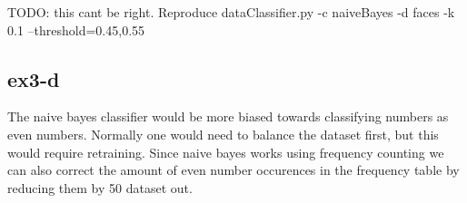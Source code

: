 TODO: this cant be right. Reproduce dataClassifier.py -c naiveBayes -d faces -k 0.1 --threshold=0.45,0.55

\subsection{ex3-d}
The naive bayes classifier would be more biased towards classifying numbers as even numbers. Normally one would need to
balance the dataset first, but this would require retraining. Since naive bayes works using frequency counting we can
also correct the amount of even number occurences in the frequency table by reducing them by 50%
dataset out.